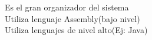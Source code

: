 \documentclass[preview]{standalone}
\begin{document}
Es el gran organizador del sistema\\Utiliza lenguaje Assembly(bajo nivel)\\Utiliza lenguajes de nivel alto(Ej: Java)\\
\end{document}

